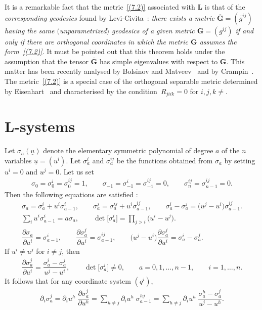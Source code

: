 \documentclass[pdftex]{sigma}
\def\bs{\boldsymbol}
\numberwithin{equation}{section}
\begin{document}
It is a remarkable fact that the metric~\eqref{(7.2)} associated with $\bs L$ is that of the {\it correspon\-ding geodesics} found by Levi-Civita~\cite{LC-1896}: {\it there exists a metric $\overline{\bs G}=(\overline g^{ij})$ having the same $($unparametrized$)$ geodesics of a given metric $\bs G=(g^{ij})$ if and only if there are orthogonal coordinates in which the metric $\bs G$ assumes the form~\eqref{(7.2)}}. It must be pointed out that this theorem holds under the assumption that the tensor $\overline {\bs G}$ has simple eigenvalues with respect to  $\bs G$. This matter has been recently analysed by Bolsinov and Matveev~\cite{Bolsinov-Matveev-2003} and by Crampin~\cite{Crampin-2003b}. The metric~\eqref{(7.2)} is a special case of the orthogonal separable metric determined by Eisenhart~\cite[Appendix~13]{Eisenhart-1949}
and characterised by the condition~$R_{jiik}=0$ for $i,j,k\neq$.

\section{L-systems}\label{section8}

Let $\sigma_a(\underline u)$ denote the elementary symmetric polynomial of degree $a$ of the $n$ variables $\underline u=(u^i)$. Let $\sigma_a^i$ and $\sigma_a^{ij}$ be the functions obtained from $\sigma_a$ by setting $u^i=0$ and $u^j=0$. Let us set
\begin{gather}
\sigma_0=\sigma_0^i=\sigma_0^{ij}=1, \qquad \sigma_{-1}=\sigma_{-1}^i=\sigma_{-1}^{ij}=0,\qquad\sigma^{ij}_n=\sigma_{n-1}^{ij}=0.
\label{(8.1)}
\end{gather}
Then the following equations are satisf\/ied \cite[Section~2]{Benenti-1992b}:
\begin{gather}
\sigma_a=\sigma_a^i+u^i \sigma_{a-1}^i, \qquad \sigma_a^j=\sigma_a^{ij}+u^i \sigma_{a-1}^{ij}, \qquad \sigma_a^i-\sigma_a^j=\big(u^j-u^i\big) \sigma^{ij}_{a-1}.
\label{(8.2)}
\\
 \sum_i u^i \sigma_{a-1}^i=a \sigma_a, \qquad
\det \big[\sigma_a^i\big]= \prod_{j>i}\big(u^i-u^j\big).
\label{(8.3)}
\\
\dfrac{\partial \sigma_a}{\partial u^i}=\sigma^i_{a-1},\qquad
\dfrac{\partial \sigma_a^j}{\partial u^i}=\sigma_{a-1}^{ij},\qquad
\big(u^j-u^i\big)\dfrac{\partial \sigma_a^j}{\partial u^i}=\sigma_a^i-\sigma_a^j.
\label{(8.4)}
\end{gather}
If $u^i\neq u^j$ for $i\neq j$, then
\begin{gather*}
\dfrac{\partial \sigma_a^j}{\partial u^i}=\dfrac{\sigma_a^i-\sigma_a^j}{u^j-u^i},
\qquad
\det \big[\sigma_a^i\big]\neq 0, \qquad a=0,1,\ldots, n-1,\qquad i=1,\ldots,n.
\end{gather*}
It follows that for any coordinate system $(q^i)$,
\begin{gather}
\partial_i\sigma_a^j=\partial_iu^h\;\dfrac{\partial\sigma_a^j}{\partial u^h}=\sum_{h\neq j}\partial_iu^h\;\sigma_{a-1}^{hj}=
\sum_{h\neq j}\partial_iu^h\;\dfrac{\sigma_a^h-\sigma_a^j}{u^j-u^h}.
\label{(8.6)}
 \end{gather}
\end{document}
